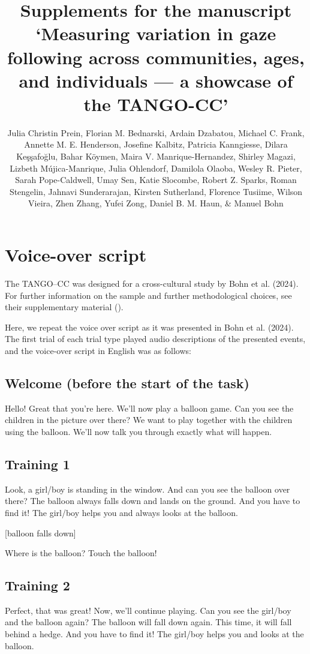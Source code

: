 \documentclass[
  man,floatsintext]{apa7}
\title{Supplements for the manuscript `Measuring variation in gaze following across communities, ages, and individuals --- a showcase of the TANGO-CC'}
\author{Julia Christin Prein\textsuperscript{}, Florian M. Bednarski\textsuperscript{}, Ardain Dzabatou\textsuperscript{}, Michael C. Frank\textsuperscript{}, Annette M. E. Henderson\textsuperscript{}, Josefine Kalbitz\textsuperscript{}, Patricia Kanngiesse\textsuperscript{}, Dilara Keşşafoğlu\textsuperscript{}, Bahar Köymen\textsuperscript{}, Maira V. Manrique-Hernandez\textsuperscript{}, Shirley Magazi\textsuperscript{}, Lizbeth Mújica-Manrique\textsuperscript{}, Julia Ohlendorf\textsuperscript{}, Damilola Olaoba\textsuperscript{}, Wesley R. Pieter\textsuperscript{}, Sarah Pope-Caldwell\textsuperscript{}, Umay Sen\textsuperscript{}, Katie Slocombe\textsuperscript{}, Robert Z. Sparks\textsuperscript{}, Roman Stengelin\textsuperscript{}, Jahnavi Sunderarajan\textsuperscript{}, Kirsten Sutherland\textsuperscript{}, Florence Tusiime\textsuperscript{}, Wilson Vieira\textsuperscript{}, Zhen Zhang\textsuperscript{}, Yufei Zong\textsuperscript{}, Daniel B. M. Haun\textsuperscript{}, \& Manuel Bohn\textsuperscript{}}
\date{}
\affiliation{\phantom{0}}
\begin{document}
\maketitle

\section{Voice-over script}\label{voice-over-script}

The TANGO--CC was designed for a cross-cultural study by Bohn et al. (2024). For further information on the sample and further methodological choices, see their supplementary material ().

Here, we repeat the voice over script as it was presented in Bohn et al. (2024). The first trial of each trial type played audio descriptions of the presented events, and the voice-over script in English was as follows:

\subsection{Welcome (before the start of the task)}\label{welcome-before-the-start-of-the-task}

Hello! Great that you're here. We'll now play a balloon game. Can you see the children in the picture over there? We want to play together with the children using the balloon. We'll now talk you through exactly what will happen.

\subsection{Training 1}\label{training-1}

Look, a girl/boy is standing in the window. And can you see the balloon over there? The balloon always falls down and lands on the ground. And you have to find it! The girl/boy helps you and always looks at the balloon.

{[}balloon falls down{]}

Where is the balloon? Touch the balloon!

\subsection{Training 2}\label{training-2}

Perfect, that was great! Now, we'll continue playing. Can you see the girl/boy and the balloon again? The balloon will fall down again. This time, it will fall behind a hedge. And you have to find it! The girl/boy helps you and looks at the balloon.
\end{document}
